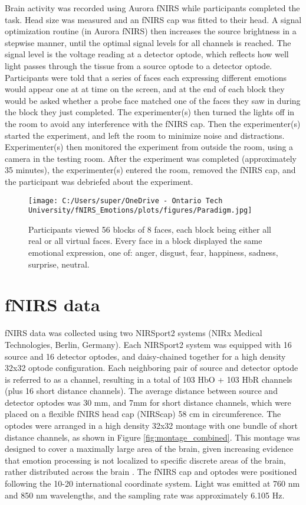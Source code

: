 Brain activity was recorded using Aurora fNIRS while participants completed the task. 
Head size was measured and an fNIRS cap was fitted to their head. 
A signal optimization routine (in Aurora fNIRS) then increases the source brightness in a stepwise manner, until the optimal signal levels for all channels is reached. 
The signal level is the voltage reading at a detector optode, which reflects how well light passes through the tissue from a source optode to a detector optode.
Participants were told that a series of faces each expressing different emotions would appear one at at time on the screen, and at the end of each block they would be asked whether a probe face matched one of the faces they saw in during the block they just completed. 
The experimenter(s) then turned the lights off in the room to avoid any interference with the fNIRS cap. 
Then the experimenter(s) started the experiment, and left the room to minimize noise and distractions.
Experimenter(s) then monitored the experiment from outside the room, using a camera in the testing room. 
After the experiment was completed (approximately 35 minutes), the experimenter(s) entered the room, removed the fNIRS cap, and the participant was debriefed about the experiment. 

\begin{figure}[H]
    \centering
    \texttt{[image: C:/Users/super/OneDrive - Ontario Tech University/fNIRS\_Emotions/plots/figures/Paradigm.jpg]}
    \caption[Experimental paradigm overview]{Participants viewed 56 blocks of 8 faces, each block being either all real or all virtual faces.
    Every face in a block displayed the same emotional expression, one of: anger, disgust, fear, happiness, sadness, surprise, neutral. }
    \label{fig:paradigm}
\end{figure}

\section{fNIRS data}
fNIRS data was collected using two NIRSport2 systems (NIRx Medical Technologies, Berlin, Germany). 
Each NIRSport2 system was equipped with 16 source and 16 detector optodes, and daisy-chained together for a high density 32x32 optode configuration. 
Each neighboring pair of source and detector optode is referred to as a channel, resulting in a total of 103 HbO + 103 HbR channels (plus 16 short distance channels).
The average distance between source and detector optodes was 30 mm, and 7mm for short distance channels, which were placed on a flexible fNIRS head cap (NIRScap) 58 cm in circumference. 
The optodes were arranged in a high density 32x32 montage with one bundle of short distance channels, as shown in Figure \ref{fig:montage_combined}.
This montage was designed to cover a maximally large area of the brain, given increasing evidence that emotion processing is not localized to specific discrete areas of the brain, rather distributed across the brain \citep{lindquist_brain_2012}. 
The fNIRS cap and optodes were positioned following the 10-20 international coordinate system.
Light was emitted at 760 nm and 850 nm wavelengths, and the sampling rate was approximately 6.105 Hz.

